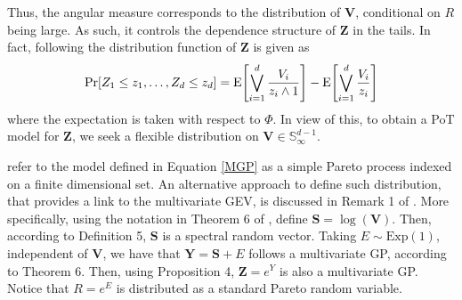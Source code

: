  Thus, the angular measure corresponds to the distribution of $\bm{V}$, conditional on $R$ being large.
 As such, it controls the dependence structure of $\bm{Z}$ in the tails. In fact, following \cite{ferreira2014} the distribution function of $\bm{Z}$ is given as
\begin{equation*}
    \prob{Z_1\leq z_1, \ldots ,Z_d\leq z_d} = \expect{\bigvee_{i=1}^d
\frac{V_i}{z_i\wedge 1}} - \expect{\bigvee_{i=1}^d
\frac{V_i}{z_i}}
\end{equation*}
where the expectation is taken with respect to $\Phi$.
In view of this, to obtain a PoT model for $\bm{Z}$, we seek 
a flexible distribution on $\bm{V} \in {\mathbb S}_{\infty}^{d-1}$.

\cite{ferreira2014} refer to the model defined in Equation \eqref{MGP} as a simple 
Pareto process indexed on a finite dimensional set. An alternative approach to 
define such distribution, that provides a link to the multivariate GEV, is discussed 
in Remark 1 of \cite{RoSeWa2018a}. More specifically, 
using the notation in Theorem 6 of \cite{RoSeWa2018a}, define $\bm{S} = \log(\bm{V})$. 
Then, according to Definition 5, $\bm{S}$ is a spectral random vector. Taking 
$E \sim \text{Exp}(1)$, independent of $\bm{V}$, we have that $\bm{Y} = \bm{S} + E$ 
follows a multivariate GP, according to Theorem 6.  Then, using Proposition 4, 
$\bm{Z} = e^{Y}$ is also a multivariate GP. Notice that $R = e^E$ is distributed as 
a standard Pareto random variable.

